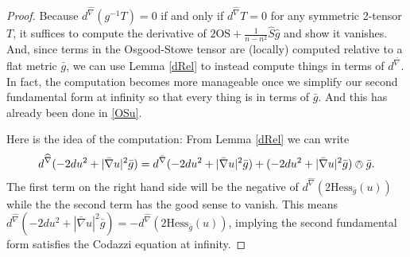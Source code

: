 \documentclass{amsart}
\numberwithin{equation}{section}
\begin{document}
\begin{proof}
Because $d^{\widehat{\nabla}}(g^{-1}T) = 0$ if and only if $d^{\widehat{\nabla}}T = 0$ for any symmetric 2-tensor $T$, it suffices to compute the derivative of $2\mathrm{OS} + \frac{1}{n-n^2}\hat{S}\hat{g}$ and show it vanishes.
And, since terms in the Osgood-Stowe tensor are (locally) computed relative to a flat metric $\bar{g}$, we can use Lemma \ref{dRel} to instead compute things in terms of $d^{\bar{\nabla}}$.
In fact, the computation becomes more manageable once we simplify our second fundamental form at infinity so that every thing is in terms of $\bar{g}$.
And this has already been done in \eqref{OSu}.

Here is the idea of the computation:
From Lemma \ref{dRel} we can write
\begin{equation}
\label{ToComp}
d^{\widehat{\nabla}}(- 2 du^2 + |\bar{\nabla}u|^2 \bar{g}) = d^{\bar{\nabla}}(- 2 du^2 + |\bar{\nabla}u|^2 \bar{g}) + (- 2 du^2 + |\bar{\nabla}u|^2 \bar{g})\owedge \bar{g}.
\end{equation}
The first term on the right hand side will be the negative of $d^{\widehat{\nabla}}(2\mathrm{Hess}_{\bar{g}}(u))$ while the the second term has the good sense to vanish. 
This means $d^{\widehat{\nabla}}(- 2 du^2 + |\bar{\nabla}u|^2 \bar{g}) = - d^{\widehat{\nabla}}(2\mathrm{Hess}_{\bar{g}}(u))$, implying the second fundamental form satisfies the Codazzi equation at infinity.


\end{proof}
\end{document}

